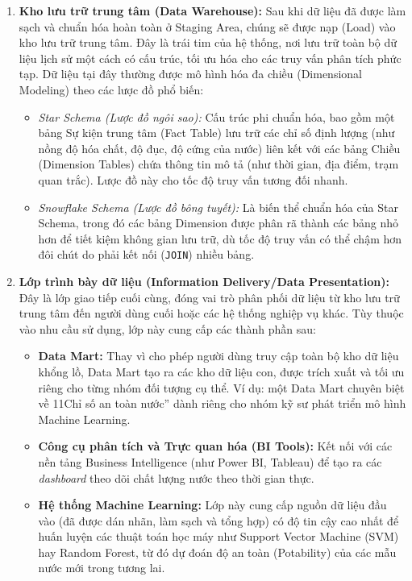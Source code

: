 \begin{enumerate}
    \item \textbf{Kho lưu trữ trung tâm (Data Warehouse):} 
    Sau khi dữ liệu đã được làm sạch và chuẩn hóa hoàn toàn ở Staging Area, chúng sẽ được nạp (Load) vào kho lưu trữ trung tâm. Đây là trái tim của hệ thống, nơi lưu trữ toàn bộ dữ liệu lịch sử một cách có cấu trúc, tối ưu hóa cho các truy vấn phân tích phức tạp. Dữ liệu tại đây thường được mô hình hóa đa chiều (Dimensional Modeling) theo các lược đồ phổ biến:
    \begin{itemize}
        \item \textit{Star Schema (Lược đồ ngôi sao):} Cấu trúc phi chuẩn hóa, bao gồm một bảng Sự kiện trung tâm (Fact Table) lưu trữ các chỉ số định lượng (như nồng độ hóa chất, độ đục, độ cứng của nước) liên kết với các bảng Chiều (Dimension Tables) chứa thông tin mô tả (như thời gian, địa điểm, trạm quan trắc). Lược đồ này cho tốc độ truy vấn tương đối nhanh.
        \item \textit{Snowflake Schema (Lược đồ bông tuyết):} Là biến thể chuẩn hóa của Star Schema, trong đó các bảng Dimension được phân rã thành các bảng nhỏ hơn để tiết kiệm không gian lưu trữ, dù tốc độ truy vấn có thể chậm hơn đôi chút do phải kết nối (\texttt{JOIN}) nhiều bảng.
    \end{itemize}

    \item \textbf{Lớp trình bày dữ liệu (Information Delivery/Data Presentation):} 
    Đây là lớp giao tiếp cuối cùng, đóng vai trò phân phối dữ liệu từ kho lưu trữ trung tâm đến người dùng cuối hoặc các hệ thống nghiệp vụ khác. Tùy thuộc vào nhu cầu sử dụng, lớp này cung cấp các thành phần sau:
    \begin{itemize}
        \item \textbf{Data Mart:} Thay vì cho phép người dùng truy cập toàn bộ kho dữ liệu khổng lồ, Data Mart tạo ra các kho dữ liệu con, được trích xuất và tối ưu riêng cho từng nhóm đối tượng cụ thể. Ví dụ: một Data Mart chuyên biệt về 11Chỉ số an toàn nước'' dành riêng cho nhóm kỹ sư phát triển mô hình Machine Learning.
        \item \textbf{Công cụ phân tích và Trực quan hóa (BI Tools):} Kết nối với các nền tảng Business Intelligence (như Power BI, Tableau) để tạo ra các \textit{dashboard} theo dõi chất lượng nước theo thời gian thực.
        \item \textbf{Hệ thống Machine Learning:} Lớp này cung cấp nguồn dữ liệu đầu vào (đã được dán nhãn, làm sạch và tổng hợp) có độ tin cậy cao nhất để huấn luyện các thuật toán học máy như Support Vector Machine (SVM) hay Random Forest, từ đó dự đoán độ an toàn (Potability) của các mẫu nước mới trong tương lai.
    \end{itemize}
\end{enumerate}


